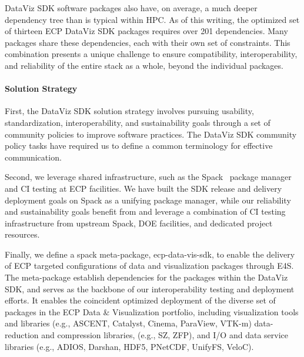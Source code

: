 DataViz SDK software packages also have, on average, a much deeper dependency tree than is typical within HPC.  As of this writing, the optimized set of thirteen ECP DataViz SDK packages requires over 201 dependencies.  Many packages share these dependencies, each with their own set of constraints.  This combination presents a unique challenge to ensure compatibility, interoperability, and reliability of the entire stack as a whole, beyond the individual packages.

\paragraph{Solution Strategy}
First, the DataViz SDK solution strategy involves pursuing usability, standardization, interoperability, and sustainability goals through a set of community policies to improve software practices. The DataViz SDK community policy tasks have required us to define a common terminology for effective communication.

Second, we leverage shared infrastructure, such as the Spack~\cite{gamblin+:sc15} package manager and CI testing at ECP facilities. We have built the SDK release and delivery deployment goals on Spack as a unifying package manager, while our reliability and sustainability goals benefit from and leverage a combination of CI testing infrastructure from upstream Spack, DOE facilities, and dedicated project resources.

Finally, we define a spack meta-package, ecp-data-vis-sdk, to enable the delivery of ECP targeted configurations of data and visualization packages through E4S.  The meta-package establish dependencies for the packages within the DataViz SDK, and serves as the backbone of our interoperability testing and deployment efforts. It enables the coincident optimized deployment of the diverse set of packages in the ECP Data \& Visualization portfolio, including
visualization tools and libraries
(e.g., ASCENT, Catalyst, Cinema, ParaView, VTK-m)
data-reduction and compression libraries,
(e.g., SZ, ZFP), and
I/O and data service libraries
(e.g., ADIOS, Darshan, HDF5, PNetCDF, UnifyFS, VeloC).


